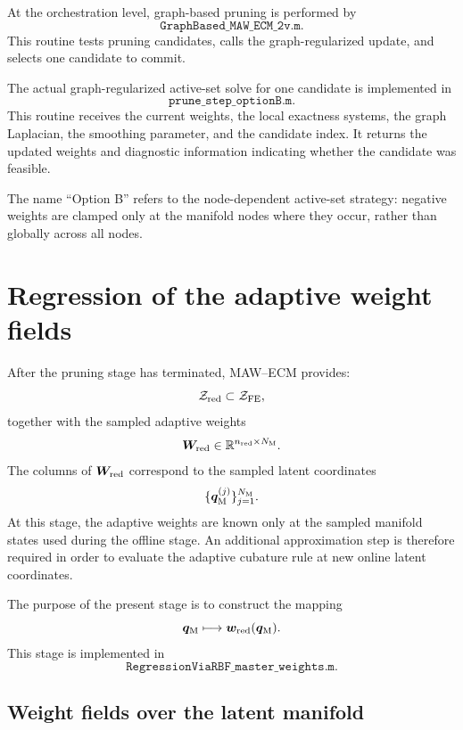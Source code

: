 \documentclass[11pt,a4paper]{article}
\begin{document}
At the orchestration level, graph-based pruning is performed by
\[
        \texttt{GraphBased\_MAW\_ECM\_2v.m}.
\]
This routine tests pruning candidates, calls the graph-regularized update, and
selects one candidate to commit.

The actual graph-regularized active-set solve for one candidate is implemented
in
\[
        \texttt{prune\_step\_optionB.m}.
\]
This routine receives the current weights, the local exactness systems, the
graph Laplacian, the smoothing parameter, and the candidate index. It returns
the updated weights and diagnostic information indicating whether the candidate
was feasible.

The name ``Option B'' refers to the node-dependent active-set strategy:
negative weights are clamped only at the manifold nodes where they occur, rather
than globally across all nodes.


\section{Regression of the adaptive weight fields}
\label{sec:weight_regression}

After the pruning stage has terminated, MAW--ECM provides:
\[
        \mathcal{Z}_{\mathrm{red}}
        \subset
        \mathcal{Z}_{\mathrm{FE}},
\]
together with the sampled adaptive weights
\[
        \bm W_{\mathrm{red}}
        \in
        \mathbb{R}^{n_{\mathrm{red}}\times N_{\mathrm{M}}}.
\]
The columns of $\bm W_{\mathrm{red}}$ correspond to the sampled latent
coordinates
\[
        \{\bm q_{\mathrm{M}}^{(j)}\}_{j=1}^{N_{\mathrm{M}}}.
\]
At this stage, the adaptive weights are known only at the sampled manifold
states used during the offline stage. An additional approximation step is
therefore required in order to evaluate the adaptive cubature rule at new
online latent coordinates.

The purpose of the present stage is to construct the mapping
\[
        \bm q_{\mathrm{M}}
        \longmapsto
        \bm w_{\mathrm{red}}(\bm q_{\mathrm{M}}).
\]
This stage is implemented in
\[
        \texttt{RegressionViaRBF\_master\_weights.m}.
\]

\subsection{Weight fields over the latent manifold}
\end{document}
